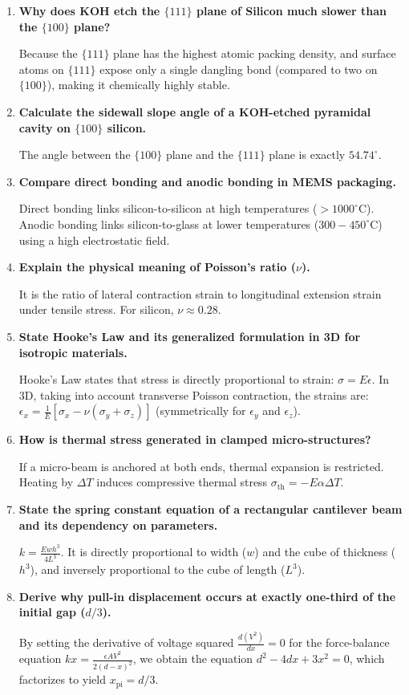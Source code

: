 \documentclass[12pt,a4paper]{article}
\newcommand{\Q}[1]{\textbf{#1}\par\noindent\ignorespaces}
\begin{document}
\begin{tcolorbox}[exambox, title={\textbf{Frequently Asked / Viva Questions}}]
\begin{enumerate}[topsep=0pt, label=\textbf{Q\arabic*.}, itemsep=5pt]
  \item \Q{Why does KOH etch the $\{111\}$ plane of Silicon much slower than the $\{100\}$ plane?}
    Because the $\{111\}$ plane has the highest atomic packing density, and surface atoms on $\{111\}$ expose only a single dangling bond (compared to two on $\{100\}$), making it chemically highly stable.
  \item \Q{Calculate the sidewall slope angle of a KOH-etched pyramidal cavity on $\{100\}$ silicon.}
    The angle between the $\{100\}$ plane and the $\{111\}$ plane is exactly $54.74^{\circ}$.
  \item \Q{Compare direct bonding and anodic bonding in MEMS packaging.}
    Direct bonding links silicon-to-silicon at high temperatures ($>1000^{\circ}\text{C}$). Anodic bonding links silicon-to-glass at lower temperatures ($300-450^{\circ}\text{C}$) using a high electrostatic field.
  \item \Q{Explain the physical meaning of Poisson's ratio ($\nu$).}
    It is the ratio of lateral contraction strain to longitudinal extension strain under tensile stress. For silicon, $\nu \approx 0.28$.
  \item \Q{State Hooke's Law and its generalized formulation in 3D for isotropic materials.}
    Hooke's Law states that stress is directly proportional to strain: $\sigma = E \epsilon$. In 3D, taking into account transverse Poisson contraction, the strains are: $\epsilon_x = \frac{1}{E} [\sigma_x - \nu(\sigma_y + \sigma_z)]$ (symmetrically for $\epsilon_y$ and $\epsilon_z$).
  \item \Q{How is thermal stress generated in clamped micro-structures?}
    If a micro-beam is anchored at both ends, thermal expansion is restricted. Heating by $\Delta T$ induces compressive thermal stress $\sigma_{\text{th}} = -E \alpha \Delta T$.
  \item \Q{State the spring constant equation of a rectangular cantilever beam and its dependency on parameters.}
    $k = \frac{E w h^3}{4 L^3}$. It is directly proportional to width ($w$) and the cube of thickness ($h^3$), and inversely proportional to the cube of length ($L^3$).
  \item \Q{Derive why pull-in displacement occurs at exactly one-third of the initial gap ($d/3$).}
    By setting the derivative of voltage squared $\frac{d(V^2)}{dx} = 0$ for the force-balance equation $k x = \frac{\epsilon A V^2}{2(d-x)^2}$, we obtain the equation $d^2 - 4dx + 3x^2 = 0$, which factorizes to yield $x_{\text{pi}} = d/3$.

\end{enumerate}
\end{tcolorbox}
\end{document}
